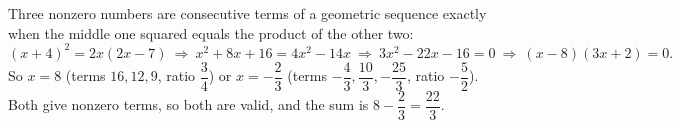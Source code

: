 Three nonzero numbers are consecutive terms of a geometric sequence exactly when the middle one squared equals the product of the other two:
\[
(x+4)^2=2x(2x-7)\ \Longrightarrow\ x^2+8x+16=4x^2-14x\ \Longrightarrow\ 3x^2-22x-16=0\ \Longrightarrow\ (x-8)(3x+2)=0 .
\]
So $x=8$ (terms $16,12,9$, ratio $\dfrac{3}{4}$) or $x=-\dfrac{2}{3}$ (terms $-\dfrac{4}{3},\dfrac{10}{3},-\dfrac{25}{3}$, ratio $-\dfrac{5}{2}$). Both give nonzero terms, so both are valid, and the sum is $8-\dfrac{2}{3}=\boxed{\dfrac{22}{3}}$.
